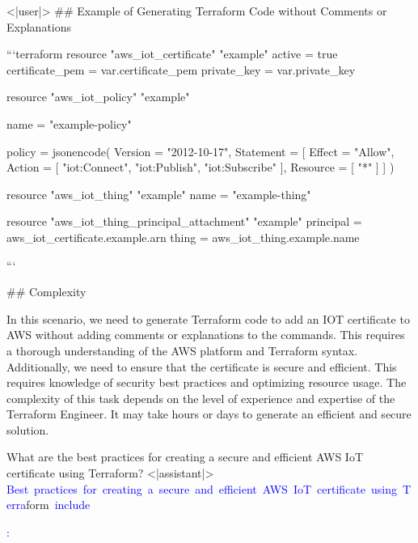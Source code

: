 \documentclass{article}
\begin{document}
\begin{tcolorbox}[colframe=black,colback=white]
<|user|>
\#\# Example of Generating Terraform Code without Comments or Explanations

```terraform
resource "aws\_iot\_certificate" "example" {
  active = true
  certificate\_pem = var.certificate\_pem
  private\_key = var.private\_key
}

resource "aws\_iot\_policy" "example" {
  name = "example-policy"

  policy = jsonencode({
    Version = "2012-10-17",
    Statement = [
      {
        Effect = "Allow",
        Action = [
          "iot:Connect",
          "iot:Publish",
          "iot:Subscribe"
        ],
        Resource = [
          "*"
        ]
      }
    ]
  })
}

resource "aws\_iot\_thing" "example" {
  name = "example-thing"
}

resource "aws\_iot\_thing\_principal\_attachment" "example" {
  principal = aws\_iot\_certificate.example.arn
  thing = aws\_iot\_thing.example.name
}

```

\#\# Complexity

In this scenario, we need to generate Terraform code to add an IOT certificate to AWS without adding comments or explanations to the commands. This requires a thorough understanding of the AWS platform and Terraform syntax. Additionally, we need to ensure that the certificate is secure and efficient. This requires knowledge of security best practices and optimizing resource usage. The complexity of this task depends on the level of experience and expertise of the Terraform Engineer. It may take hours or days to generate an efficient and secure solution.

What are the best practices for creating a secure and efficient AWS IoT certificate using Terraform?
<|assistant|>
\textcolor{blue}{Best}\textcolor{blue}{~practices}\textcolor{blue}{~for}\textcolor{blue}{~creating}\textcolor{blue}{~a}\textcolor{blue}{~secure}\textcolor{blue}{~and}\textcolor{blue}{~efficient}\textcolor{blue}{~AWS}\textcolor{blue}{~IoT}\textcolor{blue}{~certificate}\textcolor{blue}{~using}\textcolor{blue}{~Terra}form\textcolor{blue}{~include}\textcolor{blue}{:

}
\end{tcolorbox}
\end{document}
